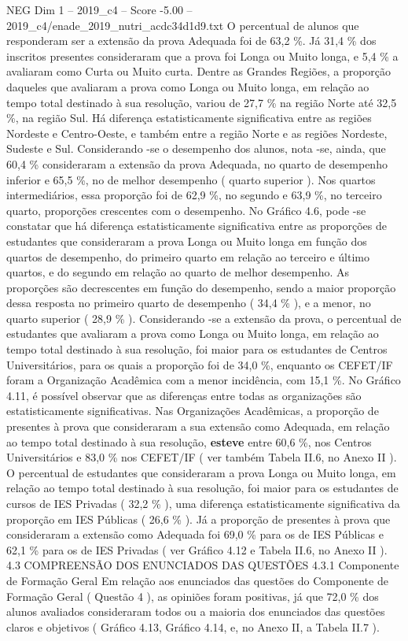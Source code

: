 \begin{textsample}{NEG Dim 1 – 2019\_c4 – Score -5.00 – 2019\_c4/enade\_2019\_nutri\_acdc34d1d9.txt}
O percentual de alunos que responderam ser a extensão da prova Adequada foi de 63,2 \%.
Já 31,4 \% dos inscritos presentes consideraram que a prova foi Longa ou Muito longa, e 5,4 \% a avaliaram como Curta ou Muito curta.
Dentre as Grandes Regiões, a proporção daqueles que avaliaram a prova como Longa ou Muito longa, em relação ao tempo total destinado à sua resolução, variou de 27,7 \% na região Norte até 32,5 \%, na região Sul.
Há diferença estatisticamente significativa entre as regiões Nordeste e Centro-Oeste, e também entre a região Norte e as regiões Nordeste, Sudeste e Sul.
Considerando -se o desempenho dos alunos, nota -se, ainda, que 60,4 \% consideraram a extensão da prova Adequada, no quarto de desempenho inferior e 65,5 \%, no de melhor desempenho ( quarto superior ).
Nos quartos intermediários, essa proporção foi de 62,9 \%, no segundo e 63,9 \%, no terceiro quarto, proporções crescentes com o desempenho.
No Gráfico 4.6, pode -se constatar que há diferença estatisticamente significativa entre as proporções de estudantes que consideraram a prova Longa ou Muito longa em função dos quartos de desempenho, do primeiro quarto em relação ao terceiro e último quartos, e do segundo em relação ao quarto de melhor desempenho.
As proporções são decrescentes em função do desempenho, sendo a maior proporção dessa resposta no primeiro quarto de desempenho ( 34,4 \% ), e a menor, no quarto superior ( 28,9 \% ).
Considerando -se a extensão da prova, o percentual de estudantes que avaliaram a prova como Longa ou Muito longa, em relação ao tempo total destinado à sua resolução, foi maior para os estudantes de Centros Universitários, para os quais a proporção foi de 34,0 \%, enquanto os CEFET/IF foram a Organização Acadêmica com a menor incidência, com 15,1 \%.
No Gráfico 4.11, é possível observar que as diferenças entre todas as organizações são estatisticamente significativas.
Nas Organizações Acadêmicas, a proporção de presentes à prova que consideraram a sua extensão como Adequada, em relação ao tempo total destinado à sua resolução, \textbf{esteve} entre 60,6 \%, nos Centros Universitários e 83,0 \% nos CEFET/IF ( ver também Tabela II.6, no Anexo II ).
O percentual de estudantes que consideraram a prova Longa ou Muito longa, em relação ao tempo total destinado à sua resolução, foi maior para os estudantes de cursos de IES Privadas ( 32,2 \% ), uma diferença estatisticamente significativa da proporção em IES Públicas ( 26,6 \% ).
Já a proporção de presentes à prova que consideraram a extensão como Adequada foi 69,0 \% para os de IES Públicas e 62,1 \% para os de IES Privadas ( ver Gráfico 4.12 e Tabela II.6, no Anexo II ). 4.3 COMPREENSÃO DOS ENUNCIADOS DAS QUESTÕES 4.3.1 Componente de Formação Geral Em relação aos enunciados das questões do Componente de Formação Geral ( Questão 4 ), as opiniões foram positivas, já que 72,0 \% dos alunos avaliados consideraram todos ou a maioria dos enunciados das questões claros e objetivos ( Gráfico 4.13, Gráfico 4.14, e, no Anexo II, a Tabela II.7 ).

\end{textsample}
